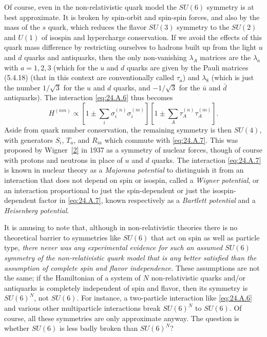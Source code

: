 Of course, even in the non-relativistic quark model the $SU(6)$ symmetry is at
best approximate. It is broken by spin-orbit and spin-spin forces, and also by
the mass of the $s$ quark, which reduces the flavor $SU(3)$ symmetry to the
$SU(2)$ and $U(1)$ of isospin and hypercharge conservation. If we avoid the
effects of this quark mass difference by restricting ourselves to hadrons built
up from the light $u$ and $d$ quarks and antiquarks, then the only non-vanishing
$\lambda_A$ matrices are the $\lambda_a$ with $a=1,2,3$ (which for the $u$ and
$d$ quarks are given by the Pauli matrices (5.4.18) (that in this context are
conventionally called $\tau_a$) and $\lambda_8$ (which is just the number
$1/\sqrt{3}$ for the $u$ and $d$ quarks, and $-1/\sqrt{3}$ for the $\bar u$
and $\bar d$ antiquarks). The interaction \eqref{eq:24.A.6} thus becomes
\begin{equation}
 H^{(nm)}\propto
 \left[1\mathbin{\pm}\sum_i\sigma_i^{(n)}\sigma_i^{(m)}\right]
 \left[1\mathbin{\pm}\sum_A\tau_A^{(n)}\tau_A^{(m)}\right].
 \tag{24.A.7}\label{eq:24.A.7}
\end{equation}
Aside from quark number conservation, the remaining symmetry is then $SU(4)$,
with generators $S_i$, $T_a$, and $R_{ia}$ which commute with
\eqref{eq:24.A.7}. This was proposed by Wigner~\hyperref[ch24-ref-2]{[2]} in
1937 as a symmetry of nuclear forces, though of course with protons and
neutrons in place of $u$ and $d$ quarks. The interaction \eqref{eq:24.A.7} is
known in nuclear theory as a \emph{Majorana potential} to distinguish it from
an interaction that does not depend on spin or isospin, called a
\emph{Wigner potential}, or an interaction proportional to just the
spin-dependent or just the isospin-dependent factor in \eqref{eq:24.A.7},
known respectively as a \emph{Bartlett potential} and a
\emph{Heisenberg potential}.

It is amusing to note that, although in non-relativistic theories there is no
theoretical barrier to symmetries like $SU(6)$ that act on spin as well as
particle type, \emph{there never was any experimental evidence for such an
assumed $SU(6)$ symmetry of the non-relativistic quark model that is any better
satisfied than the assumption of complete spin and flavor independence.}
These assumptions are not the same; if the Hamiltonian of a system of $N$
non-relativistic quarks and/or antiquarks is completely independent of spin and
flavor, then its symmetry is $SU(6)^N$, not $SU(6)$. For instance, a
two-particle interaction like \eqref{eq:24.A.6} and various other multiparticle
interactions break $SU(6)^N$ to $SU(6)$. Of course, all these symmetries are
only approximate anyway. The question is whether $SU(6)$ is less badly broken
than $SU(6)^N$?

